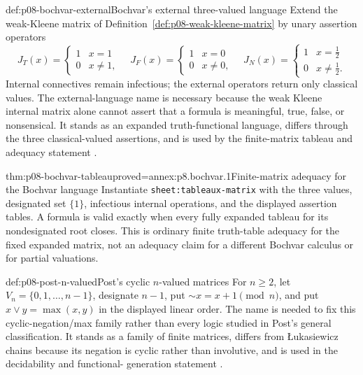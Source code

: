 \begin{hbdefinition}{def:p08-bochvar-external}{Bochvar's external three-valued language}
Extend the weak-Kleene matrix of Definition~\ref{def:p08-weak-kleene-matrix}
by unary assertion operators
\[
 J_T(x)=\begin{cases}1&x=1\\0&x\ne1,\end{cases}\quad
 J_F(x)=\begin{cases}1&x=0\\0&x\ne0,\end{cases}\quad
 J_N(x)=\begin{cases}1&x=\tfrac12\\0&x\ne\tfrac12.\end{cases}
\]
Internal connectives remain infectious; the external operators return only
classical values. The external-language name is necessary because the weak
Kleene internal matrix alone cannot assert that a formula is meaningful,
true, false, or nonsensical. It stands as an expanded truth-functional
language, differs through the three classical-valued assertions, and is used
by the finite-matrix tableau and adequacy statement
\cite{Bochvar1938English1981}.
\end{hbdefinition}

\begin{hbtheorem}{thm:p08-bochvar-tableau}{proved=annex:p8.bochvar.1}{Finite-matrix adequacy for the Bochvar language}
Instantiate \texttt{sheet:tableaux-matrix} with the three values, designated
set \(\{1\}\), infectious internal operations, and the displayed assertion
tables. A formula is valid exactly when every fully expanded tableau for its
nondesignated root closes. This is ordinary finite truth-table adequacy for the
fixed expanded matrix, not an adequacy claim for a different Bochvar calculus
or for partial valuations.
\end{hbtheorem}

\begin{hbdefinition}{def:p08-post-n-valued}{Post's cyclic \(n\)-valued matrices}
For \(n\ge2\), let \(V_n=\{0,1,\ldots,n-1\}\), designate \(n-1\), put
\(\sim x=x+1\pmod n\), and put \(x\vee y=\max(x,y)\) in the displayed linear
order. The name is needed to fix this cyclic-negation/max family rather than
every logic studied in Post's general classification. It stands as a family of
finite matrices, differs from \L{}ukasiewicz chains because its negation is
cyclic rather than involutive, and is used in the decidability and functional-
generation statement \cite{Post1921}.
\end{hbdefinition}

